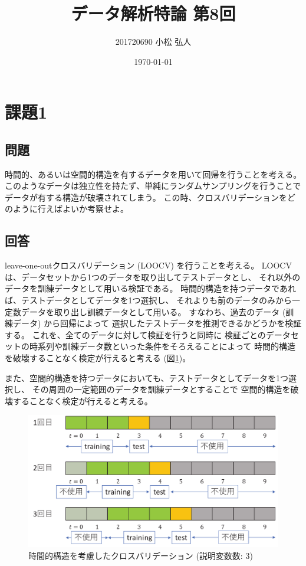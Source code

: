 \documentclass{jsarticle}
\title{データ解析特論 第8回}
\author{201720690 小松 弘人}
\date{\today}
\begin{document}
\maketitle
\thispagestyle{empty}
\section{課題1}
\subsection{問題}
時間的、あるいは空間的構造を有するデータを用いて回帰を行うことを考える。
このようなデータは独立性を持たず、単純にランダムサンプリングを行うことで
データが有する構造が破壊されてしまう。
この時、クロスバリデーションをどのように行えばよいか考察せよ。

\subsection{回答}
leave-one-outクロスバリデーション (LOOCV) を行うことを考える。
LOOCVは、データセットから1つのデータを取り出してテストデータとし、
それ以外のデータを訓練データとして用いる検証である。
時間的構造を持つデータであれば、テストデータとしてデータを1つ選択し、
それよりも前のデータのみから一定数データを取り出し訓練データとして用いる。
すなわち、過去のデータ (訓練データ) から回帰によって
選択したテストデータを推測できるかどうかを検証する。
これを、全てのデータに対して検証を行うと同時に
検証ごとのデータセットの時系列や訓練データ数といった条件をそろえることによって
時間的構造を破壊することなく検定が行えると考える (図\ref{img:overview})。

また、空間的構造を持つデータにおいても、テストデータとしてデータを1つ選択し、
その周囲の一定範囲のデータを訓練データとすることで
空間的構造を破壊することなく検定が行えると考える。

\begin{figure}[b]
    \centering
    \includegraphics[width=.6\linewidth]{img/loocv.pdf}
    \caption{時間的構造を考慮したクロスバリデーション (説明変数数: 3)}
    \label{img:overview}
\end{figure}
\end{document}
